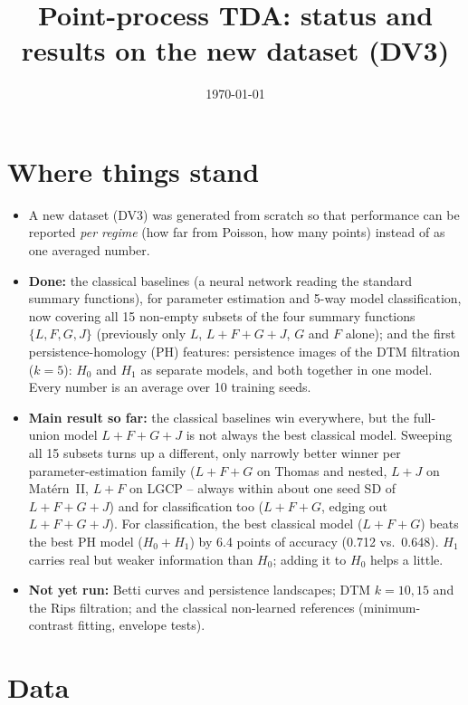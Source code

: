 \documentclass[10pt,a4paper]{article}
\title{\textbf{Point-process TDA: status and results on the new dataset (DV3)}}
\date{\today}
\begin{document}
\maketitle

\section{Where things stand}

\begin{itemize}
  \item A new dataset (DV3) was generated from scratch so that performance can be reported \emph{per regime} (how far from Poisson, how many points) instead of as one averaged number.
  \item \textbf{Done:} the classical baselines (a neural network reading the standard summary functions), for parameter estimation and 5-way model classification, now covering all 15 non-empty subsets of the four summary functions $\{L,F,G,J\}$ (previously only $L$, $L{+}F{+}G{+}J$, $G$ and $F$ alone); and the first persistence-homology (PH) features: persistence images of the DTM filtration ($k=5$): $H_0$ and $H_1$ as separate models, and both together in one model. Every number is an average over 10 training seeds.
  \item \textbf{Main result so far:} the classical baselines win everywhere, but the full-union model $L{+}F{+}G{+}J$ is not always the best classical model. Sweeping all 15 subsets turns up a different, only narrowly better winner per parameter-estimation family ($L{+}F{+}G$ on Thomas and nested, $L{+}J$ on Mat\'ern~II, $L{+}F$ on LGCP -- always within about one seed SD of $L{+}F{+}G{+}J$) and for classification too ($L{+}F{+}G$, edging out $L{+}F{+}G{+}J$). For classification, the best classical model ($L{+}F{+}G$) beats the best PH model ($H_0{+}H_1$) by 6.4 points of accuracy (0.712 vs.\ 0.648). $H_1$ carries real but weaker information than $H_0$; adding it to $H_0$ helps a little.
  \item \textbf{Not yet run:} Betti curves and persistence landscapes; DTM $k=10, 15$ and the Rips filtration; and the classical non-learned references (minimum-contrast fitting, envelope tests).
\end{itemize}

\section{Data}
\end{document}
